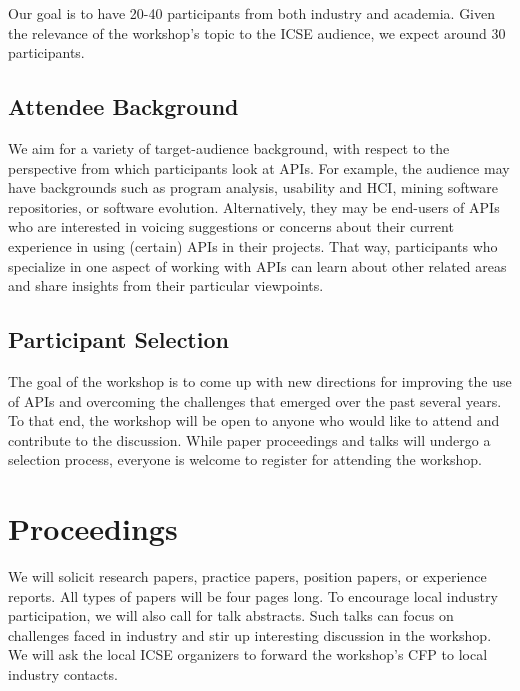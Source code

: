 \documentclass[10pt, conference]{IEEEtran}
\begin{document}
Our goal is to have 20-40 participants from both industry and academia. Given the relevance of the workshop's topic to the ICSE audience, we expect around 30 participants.

\subsection{Attendee Background} 
We aim for a variety of target-audience background, with respect to the perspective from which participants look at APIs. For example, the audience may have backgrounds such as program analysis, usability and HCI, mining software repositories, or software evolution. Alternatively, they may be end-users of APIs who are interested in voicing suggestions or concerns about their current experience in using (certain) APIs in their projects. That way, participants who specialize in one aspect of working with APIs can learn about other related areas and share insights from their particular viewpoints.

\subsection{Participant Selection}
The goal of the workshop is to come up with new directions for improving the use of APIs and overcoming the challenges that emerged over the past several years. To that end, the workshop will be open to anyone who would like to attend and contribute to the discussion. While paper proceedings and talks will undergo a selection process, everyone is welcome to register for attending the workshop. 

\section{Proceedings}

We will solicit research papers, practice papers, position papers, or experience reports. All types of papers will be four pages long. To encourage local industry participation, we will also call for talk abstracts. Such talks can focus on challenges faced in industry and stir up interesting discussion in the workshop. We will ask the local ICSE organizers to forward the workshop's CFP to local industry contacts.
\end{document}
